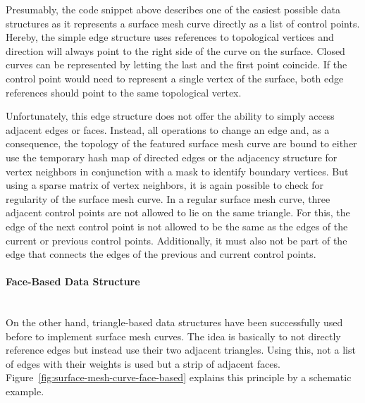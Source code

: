 \documentclass{stdlocal}
\begin{document}
  Presumably, the code snippet above describes one of the easiest possible data structures as it represents a surface mesh curve directly as a list of control points.
  Hereby, the simple edge structure uses references to topological vertices and direction will always point to the right side of the curve on the surface.
  Closed curves can be represented by letting the last and the first point coincide.
  If the control point would need to represent a single vertex of the surface, both edge references should point to the same topological vertex.

  Unfortunately, this edge structure does not offer the ability to simply access adjacent edges or faces.
  Instead, all operations to change an edge and, as a consequence, the topology of the featured surface mesh curve are bound to either use the temporary hash map of directed edges or the adjacency structure for vertex neighbors in conjunction with a mask to identify boundary vertices.
  But using a sparse matrix of vertex neighbors, it is again possible to check for regularity of the surface mesh curve.
  In a regular surface mesh curve, three adjacent control points are not allowed to lie on the same triangle.
  For this, the edge of the next control point is not allowed to be the same as the edges of the current or previous control points.
  Additionally, it must also not be part of the edge that connects the edges of the previous and current control points.

  \paragraph{Face-Based Data Structure}\hfill\\
  On the other hand, triangle-based data structures have been successfully used before to implement surface mesh curves.
  The idea is basically to not directly reference edges but instead use their two adjacent triangles.
  Using this, not a list of edges with their weights is used but a strip of adjacent faces.
  Figure~\ref{fig:surface-mesh-curve-face-based} explains this principle by a schematic example.
\end{document}

